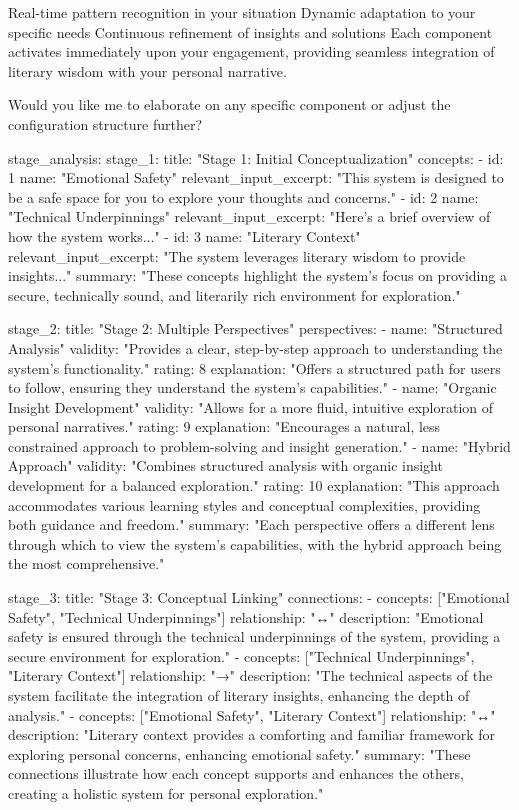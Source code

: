 Real-time pattern recognition in your situation
Dynamic adaptation to your specific needs
Continuous refinement of insights and solutions
Each component activates immediately upon your engagement, providing seamless integration of literary wisdom with your personal narrative.

Would you like me to elaborate on any specific component or adjust the configuration structure further?

stage_analysis:
  stage_1:
    title: "Stage 1: Initial Conceptualization"
    concepts:
      - id: 1
        name: "Emotional Safety"
        relevant_input_excerpt: "This system is designed to be a safe space for you to explore your thoughts and concerns."
      - id: 2
        name: "Technical Underpinnings"
        relevant_input_excerpt: "Here's a brief overview of how the system works..."
      - id: 3
        name: "Literary Context"
        relevant_input_excerpt: "The system leverages literary wisdom to provide insights..."
    summary: "These concepts highlight the system's focus on providing a secure, technically sound, and literarily rich environment for exploration."

  stage_2:
    title: "Stage 2: Multiple Perspectives"
    perspectives:
      - name: "Structured Analysis"
        validity: "Provides a clear, step-by-step approach to understanding the system's functionality."
        rating: 8
        explanation: "Offers a structured path for users to follow, ensuring they understand the system's capabilities."
      - name: "Organic Insight Development"
        validity: "Allows for a more fluid, intuitive exploration of personal narratives."
        rating: 9
        explanation: "Encourages a natural, less constrained approach to problem-solving and insight generation."
      - name: "Hybrid Approach"
        validity: "Combines structured analysis with organic insight development for a balanced exploration."
        rating: 10
        explanation: "This approach accommodates various learning styles and conceptual complexities, providing both guidance and freedom."
    summary: "Each perspective offers a different lens through which to view the system's capabilities, with the hybrid approach being the most comprehensive."

  stage_3:
    title: "Stage 3: Conceptual Linking"
    connections:
      - concepts: ["Emotional Safety", "Technical Underpinnings"]
        relationship: "↔"
        description: "Emotional safety is ensured through the technical underpinnings of the system, providing a secure environment for exploration."
      - concepts: ["Technical Underpinnings", "Literary Context"]
        relationship: "→"
        description: "The technical aspects of the system facilitate the integration of literary insights, enhancing the depth of analysis."
      - concepts: ["Emotional Safety", "Literary Context"]
        relationship: "↔"
        description: "Literary context provides a comforting and familiar framework for exploring personal concerns, enhancing emotional safety."
    summary: "These connections illustrate how each concept supports and enhances the others, creating a holistic system for personal exploration."

